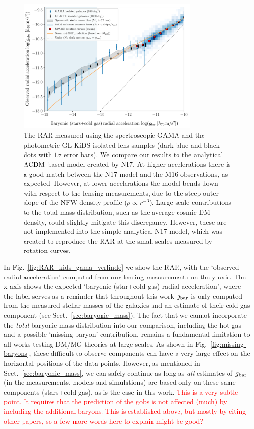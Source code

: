 \documentclass[usenatbib]{mnras}
\newcommand{\lcdm}{{\rm \Lambda CDM}}
\newcommand{\un}[1]{_{\rm #1}}
\begin{document}
\begin{figure}
	\includegraphics[width=0.8\textwidth]{Figures/RAR_KiDS+GAMA+Navarro_Nobins_isolated.pdf}
	\caption{The RAR measured using the spectroscopic GAMA and the photometric GL-KiDS isolated lens samples (dark blue and black dots with $1\sigma$ error bars). We compare our results to the analytical $\lcdm$-based model created by N17. At higher accelerations there is a good match between the N17 model and the M16 observations, as expected. However, at lower accelerations the model bends down with respect to the lensing measurements, due to the steep outer slope of the NFW density profile ($\rho \propto r^{-3}$). Large-scale contributions to the total mass distribution, such as the average cosmic DM density, could slightly mitigate this discrepancy. However, these are not implemented into the simple analytical N17 model, which was created to reproduce the RAR at the small scales measured by rotation curves.}
	\label{fig:RAR_kids_gama_Navarro}
\end{figure}

In Fig.~\ref{fig:RAR_kids_gama_verlinde} we show the RAR, with the `observed radial acceleration' computed from our lensing measurements on the y-axis. The x-axis shows the expected `baryonic (star+cold gas) radial acceleration', where the label serves as a reminder that throughout this work $g\un{bar}$ is only computed from the measured stellar masses of the galaxies and an estimate of their cold gas component (see Sect.~\ref{sec:baryonic_mass}). The fact that we cannot incorporate the \emph{total} baryonic mass distribution into our comparison, including the hot gas and a possible `missing baryon' contribution, remains a fundamental limitation to all works testing DM/MG theories at large scales. As shown in Fig.~\ref{fig:missing-baryons}, these difficult to observe components can have a very large effect on the horizontal positions of the data-points. However, as mentioned in Sect.~\ref{sec:baryonic_mass}, we can safely continue as long as \emph{all} estimates of $g\un{bar}$ (in the measurements, models and simulations) are based only on these same components (stars+cold gas), as is the case in this work. \textcolor{red}{This is a very subtle point. It requires that the prediction of the gobs is not affected (much) by including the additional baryons. This is established above, but mostly by citing other papers, so a few more words here to explain might be good?}
\end{document}
